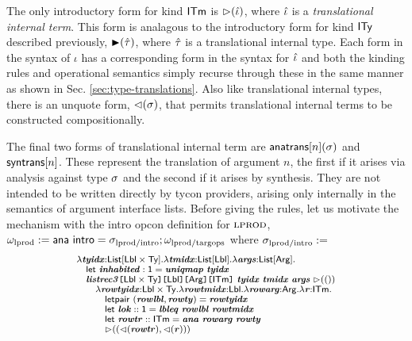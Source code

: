 \documentclass[10pt,preprint]{sigplanconf}
\begin{document}
The only introductory form for kind ${\sf ITm}$ is ${\rhd}(\hat{\iota})$, where $\hat{\iota}$ is a \emph{translational internal term}. This form is analagous to the introductory form for kind ${\sf ITy}$ described previously, ${\blacktriangleright}(\hat{\tau})$, where $\hat{\tau}$ is a translational internal type. Each form in the syntax of $\iota$ has a corresponding form in the syntax for $\hat{\iota}$ and both the kinding rules and operational semantics simply recurse through these in the same manner as shown in Sec. \ref{sec:type-translations}. Also like translational internal types, there is an unquote form, ${\lhd}(\sigma)$, that permits translational internal terms to be constructed compositionally. %

The final two forms of translational internal term are ${\sf anatrans}[n](\sigma)$ and ${\sf syntrans}[n]$. These represent the translation of argument $n$, the first if it arises via analysis against type $\sigma$ and the second if it arises by synthesis. They are not intended to be written directly by tycon providers, arising only internally in the semantics of argument interface lists. Before giving the rules, let us motivate the mechanism with the intro opcon definition for $\textsc{lprod}$, $\omega_\text{lprod} := {\sf ana}~{\sf intro}=\sigma_\text{lprod/intro}; \omega_\text{lprod/targops}$ where $\sigma_\text{lprod/intro} :=$
\[\small
\begin{array}{l}
\lambda\svar{tyidx}{:}\klist{\klbl\times\kty}.\lambda\svar{tmidx}{:}\klist{\klbl}.\lambda\svar{args}{:}\kargs.\\
\quad \keyw{let}~\svar{inhabited}:\kunit=\svar{uniqmap}~\svar{tyidx}\\
\quad \skap{\kitm}{\skap{\karg}{\skap{\klbl}{\skap{\klbl\times\kty}{\svar{listrec3}}}}}~\svar{tyidx}~\svar{tmidx}~\svar{args}~\sqitm{\itriv}\\
\quad\quad \lambda \svar{rowtyidx}{:}\klbl\times\kty.\lambda \svar{rowtmidx}{:}\klbl.\lambda\svar{rowarg}{:}\karg.\lambda \svar{r}{:}\kitm.\\
\quad\quad\quad \keyw{letpair}~(\svar{rowlbl}, \svar{rowty})=\svar{rowtyidx}\\
\quad\quad\quad \keyw{let}~\svar{lok}::\kunit=\svar{lbleq}~\svar{rowlbl} ~\svar{rowtmidx}\\
\quad\quad\quad \keyw{let}~\svar{rowtr} :: \kitm = \svar{ana}~\svar{rowarg}~\svar{rowty}\\
\quad\quad\quad \sqitm{(\quq{\svar{rowtr}}, \quq{\svar{r}})
}
\end{array}
\]
\end{document}
